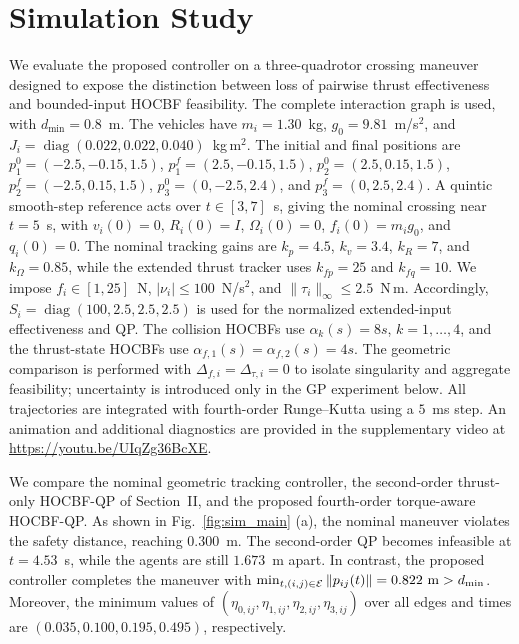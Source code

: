 \documentclass[journal,twoside,web]{ieeecolor}
\begin{document}
\section{Simulation Study}
\label{sec:simulations}

We evaluate the proposed controller on a three-quadrotor crossing
maneuver designed to expose the distinction between loss of pairwise
thrust effectiveness and bounded-input HOCBF feasibility. The complete
interaction graph is used, with $d_{\min}=0.8$~m. The vehicles have
$m_i=1.30$~kg, $g_0=9.81$~m/s$^2$, and
$J_i=\operatorname{diag}(0.022,0.022,0.040)$~kg\,m$^2$.
The initial and final positions are
$p_1^0=(-2.5,-0.15,1.5)$, $p_1^f=(2.5,-0.15,1.5)$,
$p_2^0=(2.5,0.15,1.5)$, $p_2^f=(-2.5,0.15,1.5)$,
$p_3^0=(0,-2.5,2.4)$, and $p_3^f=(0,2.5,2.4)$.
A quintic smooth-step reference acts over $t\in[3,7]$~s, giving the
nominal crossing near $t=5$~s, with
$v_i(0)=0$, $R_i(0)=I$, $\Omega_i(0)=0$,
$f_i(0)=m_i g_0$, and $q_i(0)=0$.
The nominal tracking gains are
$k_p=4.5$, $k_v=3.4$, $k_R=7$, and $k_\Omega=0.85$,
while the extended thrust tracker uses $k_{fp}=25$ and $k_{fq}=10$.
We impose $f_i\in[1,25]$~N, $|\nu_i|\le100$~N/s$^2$, and
$\|\tau_i\|_\infty\le2.5$~N\,m. Accordingly,
$S_i=\operatorname{diag}(100,2.5,2.5,2.5)$ is used for the normalized
extended-input effectiveness and QP. The collision HOCBFs use
$\alpha_k(s)=8s$, $k=1,\ldots,4$, and the thrust-state HOCBFs use
$\alpha_{f,1}(s)=\alpha_{f,2}(s)=4s$.
The geometric comparison is performed with
$\Delta_{f,i}=\Delta_{\tau,i}=0$ to isolate singularity and aggregate
feasibility; uncertainty is introduced only in the GP experiment below.
All trajectories are integrated with fourth-order Runge--Kutta using a
$5$~ms step. An animation and additional diagnostics are provided in the
supplementary video at
\url{https://youtu.be/UIqZg36BcXE}.

We compare the nominal geometric tracking controller, the
second-order thrust-only HOCBF-QP of Section~II, and the proposed
fourth-order torque-aware HOCBF-QP. As shown in
Fig.~\ref{fig:sim_main} (a), the nominal maneuver violates the safety
distance, reaching $0.300$~m. The second-order QP becomes infeasible at
$t=4.53$~s, while the agents are still $1.673$~m apart. In contrast,
the proposed controller completes the maneuver with
$\min_{t,(i,j)\in\mathcal E}\|p_{ij}(t)\|
    =0.822~{\rm m}>d_{\min}$. Moreover, the minimum values of
$(\eta_{0,ij},\eta_{1,ij},\eta_{2,ij},\eta_{3,ij})$
over all edges and times are
$(0.035,0.100,0.195,0.495)$, respectively.
\end{document}
